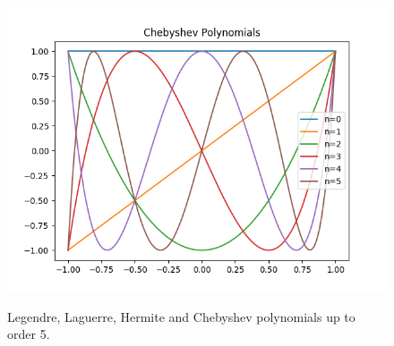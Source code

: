 \documentclass{article}
\begin{document}
\begin{figure}[h]
{\includegraphics[scale=0.35]{Images/chebyshev.png}
}
\caption{Legendre, Laguerre, Hermite and Chebyshev polynomials up to order 5.}
\end{figure}
\end{document}
